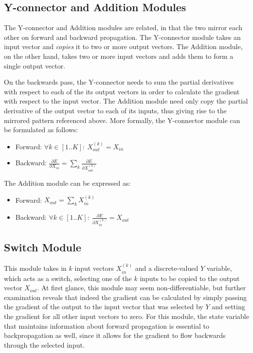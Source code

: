 \subsection{Y-connector and Addition Modules}

The Y-connector and Addition modules are related, in that the two mirror each other on forward and backward propagation.
The Y-connector module takes an input vector and \textit{copies} it to two or more output vectors.
The Addition module, on the other hand, takes two or more input vectors and adds them to form a single output vector.

On the backwards pass, the Y-connector needs to sum the partial derivatives with respect to each of the its output vectors in order to calculate the gradient with respect to the input vector.
The Addition module need only copy the partial derivative of the output vector to each of its inputs, thus giving rise to the mirrored pattern referenced above.
More formally, the Y-connector module can be formulated as follows:
\begin{itemize}
    \item Forward: $\forall k \in [1..K]: \ X_{out}^{(k)} = X_{in}$
    \item Backward: $\frac{\partial E}{\partial X_{in}} = \sum_k{\frac{\partial E}{\partial X_{out}^{(k)}}}$
\end{itemize}
The Addition module can be expressed as:
\begin{itemize}
    \item Forward: $X_{out} = \sum_k{X_{in}^{(k)}}$
    \item Backward: $\forall k \in [1..K]: \ \frac{\partial E}{\partial X_{in}^{(k)}} = X_{out}$
\end{itemize}

\subsection{Switch Module}

This module takes in $k$ input vectors $X_{in}^{(k)}$ and a discrete-valued $Y$ variable, which acts as a switch, selecting one of the $k$ inputs to be copied to the output vector $X_{out}$.
At first glance, this module may seem non-differentiable, but further examination reveals that indeed the gradient can be calculated by simply passing the gradient of the output to the input vector that was selected by $Y$ and setting the gradient for all other input vectors to zero.
For this module, the state variable that maintains information about forward propagation is essential to backpropagation as well, since it allows for the gradient to flow backwards through the selected input.

